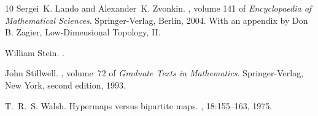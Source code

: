 \documentclass[amstags,fleqn,reqno]{article}
\theoremstyle{plain}
\theoremstyle{definition}
\begin{document}
\begin{thebibliography}{10}
Sergei~K. Lando and Alexander~K. Zvonkin.
, volume 141 of {\em
  Encyclopaedia of Mathematical Sciences}.
\newblock Springer-Verlag, Berlin, 2004.
\newblock With an appendix by Don B. Zagier, Low-Dimensional Topology, II.

William Stein.
.

John Stillwell.
, volume~72 of
  {\em Graduate Texts in Mathematics}.
\newblock Springer-Verlag, New York, second edition, 1993.

T.~R.~S. Walsh.
\newblock Hypermaps versus bipartite maps.
, 18:155--163, 1975.

\end{thebibliography}
\end{document}
